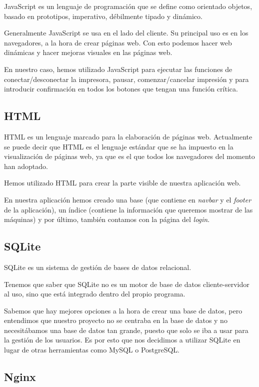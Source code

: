 JavaScript \cite{wiki:javascript} es un lenguaje de programación que se define como orientado objetos, basado en prototipos, imperativo, débilmente tipado y dinámico.

Generalmente JavaScript se usa en el lado del cliente. Su principal uso es en los navegadores, a la hora de crear páginas web. Con esto podemos hacer web dinámicas y hacer mejoras visuales en las páginas web.

En nuestro caso, hemos utilizado JavaScript para ejecutar las funciones de conectar/desconectar la impresora, pausar, comenzar/cancelar  impresión y para introducir confirmación en todos los botones que tengan una función crítica.

\subsection{HTML}

HTML \cite{wiki:html} es un lenguaje marcado para la elaboración de páginas web. Actualmente se puede decir que HTML es el lenguaje estándar que se ha impuesto en la visualización de páginas web, ya que es el que todos los navegadores del momento han adoptado.

Hemos utilizado HTML para crear la parte visible de nuestra aplicación web. 

En nuestra aplicación hemos creado una base (que contiene en \textit{navbar} y el \textit{footer} de la aplicación), un índice (contiene la información que queremos mostrar de las máquinas) y por último, también contamos con la página del \textit{login}.


\subsection{SQLite}

SQLite \cite{wiki:sqlite} es un sistema de gestión de bases de datos relacional.

Tenemos que saber que SQLite no es un motor de base de datos cliente-servidor al uso, sino que está integrado dentro del propio programa.

Sabemos que hay mejores opciones a la hora de crear una base de datos, pero entendimos que nuestro proyecto no se centraba en la base de datos y no necesitábamos una base de datos tan grande, puesto que solo se iba a usar para la gestión de los usuarios. Es por esto que nos decidimos a utilizar SQLite en lugar de otras herramientas como MySQL o PostgreSQL.

\subsection{Nginx}

